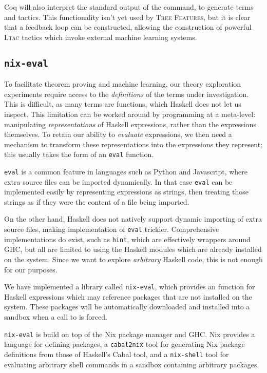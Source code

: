 Coq will also interpret the standard output of the command, to generate terms and tactics. This functionality isn't yet used by \textsc{Tree Features}, but it is clear that a feedback loop can be constructed, allowing the construction of powerful \textsc{Ltac} tactics which invoke external machine learning systems.

\subsection{\texttt{nix-eval}}\label{nixeval}

To facilitate theorem proving and machine learning, our theory exploration experiments require access to the \emph{definitions} of the terms under investigation. This is difficult, as many terms are functions, which Haskell does not let us inspect. This limitation can be worked around by programming at a meta-level: manipulating \emph{representations} of Haskell expressions, rather than the expressions themselves. To retain our ability to \emph{evaluate} expressions, we then need a mechanism to transform these representations into the expressions they represent; this usually takes the form of an \texttt{eval} function.

\texttt{eval} is a common feature in languages such as Python and Javascript, where extra source files can be imported dynamically. In that case \texttt{eval} can be implemented easily by representing expressions as strings, then treating those strings as if they were the content of a file being imported.

On the other hand, Haskell does not natively support dynamic importing of extra source files, making implementation of \texttt{eval} trickier. Comprehensive implementations do exist, such as \texttt{hint}, which are effectively wrappers around GHC, but all are limited to using the Haskell modules which are already installed on the system. Since we want to explore \emph{arbitrary} Haskell code, this is not enough for our purposes.

We have implemented a library called \texttt{nix-eval}, which provides an  function for Haskell expressions which may reference packages that are not installed on the system. These packages will be automatically downloaded and installed into a sandbox when a call to  is forced.

\texttt{nix-eval} is build on top of the Nix package manager and GHC. Nix provides a language for defining packages, a \texttt{cabal2nix} tool for generating Nix package definitions from those of Haskell's Cabal tool, and a \texttt{nix-shell} tool for evaluating arbitrary shell commands in a sandbox containing arbitrary packages.

